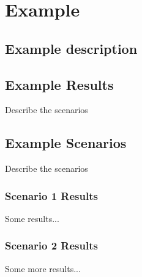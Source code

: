 \section{Example}


\subsection{Example description}






%

\subsection{Example Results}

Describe the scenarios

\subsection{Example Scenarios}

Describe the scenarios

%


\subsubsection{Scenario 1 Results}

Some results...


\subsubsection{Scenario 2 Results}


Some more results...

